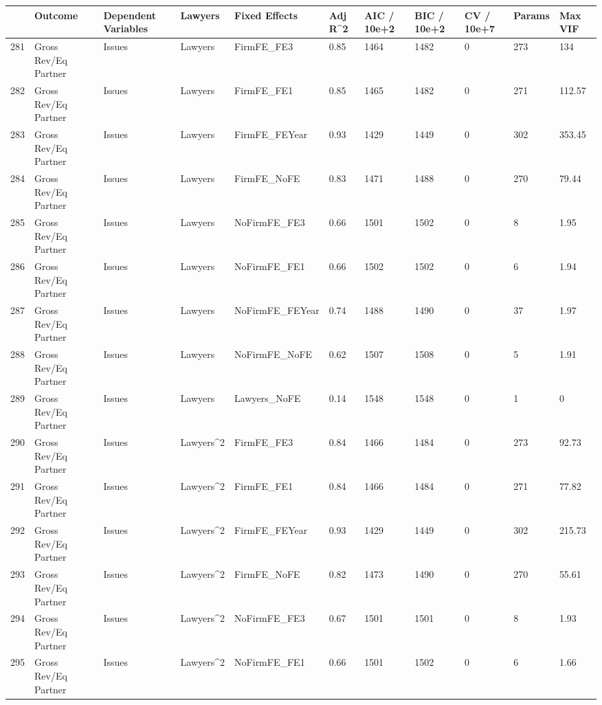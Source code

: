 \begin{table}[ht]
\centering
\begin{tabular}{rllllllllll}
  \hline
 & Outcome & Dependent Variables & Lawyers & Fixed Effects & Adj R^2 & AIC / 10e+2 & BIC / 10e+2 & CV / 10e+7 & Params & Max VIF \\ 
  \hline
281 & Gross Rev/Eq Partner & Issues & Lawyers & FirmFE\_FE3 & 0.85 & 1464 & 1482 & 0 & 273 & 134 \\ 
  282 & Gross Rev/Eq Partner & Issues & Lawyers & FirmFE\_FE1 & 0.85 & 1465 & 1482 & 0 & 271 & 112.57 \\ 
  283 & Gross Rev/Eq Partner & Issues & Lawyers & FirmFE\_FEYear & 0.93 & 1429 & 1449 & 0 & 302 & 353.45 \\ 
  284 & Gross Rev/Eq Partner & Issues & Lawyers & FirmFE\_NoFE & 0.83 & 1471 & 1488 & 0 & 270 & 79.44 \\ 
  285 & Gross Rev/Eq Partner & Issues & Lawyers & NoFirmFE\_FE3 & 0.66 & 1501 & 1502 & 0 & 8 & 1.95 \\ 
  286 & Gross Rev/Eq Partner & Issues & Lawyers & NoFirmFE\_FE1 & 0.66 & 1502 & 1502 & 0 & 6 & 1.94 \\ 
  287 & Gross Rev/Eq Partner & Issues & Lawyers & NoFirmFE\_FEYear & 0.74 & 1488 & 1490 & 0 & 37 & 1.97 \\ 
  288 & Gross Rev/Eq Partner & Issues & Lawyers & NoFirmFE\_NoFE & 0.62 & 1507 & 1508 & 0 & 5 & 1.91 \\ 
  289 & Gross Rev/Eq Partner & Issues & Lawyers & Lawyers\_NoFE & 0.14 & 1548 & 1548 & 0 & 1 & 0 \\ 
  290 & Gross Rev/Eq Partner & Issues & Lawyers^2 & FirmFE\_FE3 & 0.84 & 1466 & 1484 & 0 & 273 & 92.73 \\ 
  291 & Gross Rev/Eq Partner & Issues & Lawyers^2 & FirmFE\_FE1 & 0.84 & 1466 & 1484 & 0 & 271 & 77.82 \\ 
  292 & Gross Rev/Eq Partner & Issues & Lawyers^2 & FirmFE\_FEYear & 0.93 & 1429 & 1449 & 0 & 302 & 215.73 \\ 
  293 & Gross Rev/Eq Partner & Issues & Lawyers^2 & FirmFE\_NoFE & 0.82 & 1473 & 1490 & 0 & 270 & 55.61 \\ 
  294 & Gross Rev/Eq Partner & Issues & Lawyers^2 & NoFirmFE\_FE3 & 0.67 & 1501 & 1501 & 0 & 8 & 1.93 \\ 
  295 & Gross Rev/Eq Partner & Issues & Lawyers^2 & NoFirmFE\_FE1 & 0.66 & 1501 & 1502 & 0 & 6 & 1.66 \\ 

\end{tabular}
\end{table}
